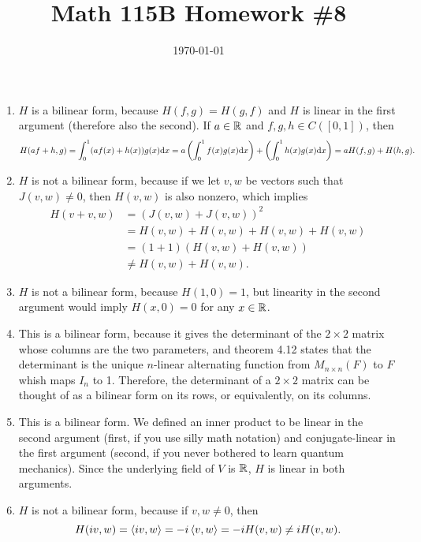 \documentclass{article}
\date{\today}
\title{Math 115B Homework \#8}
\begin{document}
\maketitle

\begin{prob}
\end{prob}
\begin{enumerate}[label=(\alph*)]
    \item $H$ is a bilinear form, because $H(f,g)=H(g,f)$ and $H$ is linear in the first argument (therefore also the second). If $a \in \mathbb{R}$ and $f,g,h \in C([0,1])$, then
        \[ H(af+h,g)=\int_0^1 (af(x)+h(x))g(x) \mathrm{d} x = a \left( \int_0^1 f(x) g(x) \mathrm{d} x \right) +\left( \int_0^1 h(x)g(x) \mathrm{d} x \right) = aH(f,g)+H(h,g). \]
    \item $H$ is not a bilinear form, because if we let $v,w$ be vectors such that $J(v,w) \neq 0$, then $H(v,w)$ is also nonzero, which implies \begin{align*}
            H(v+v,w) &= (J(v,w)+J(v,w))^2 \\
                     &= H(v,w)+H(v,w)+H(v,w)+H(v,w) \\
                     &= (1+1)(H(v,w)+H(v,w)) \\
                     &\neq H(v,w)+H(v,w).
    \end{align*}
\item $H$ is not a bilinear form, because $H(1, 0)=1$, but linearity in the second argument would imply $H(x, 0)=0$ for any $x \in \mathbb{R}$.
\item This is a bilinear form, because it gives the determinant of the $2 \times 2$ matrix whose columns are the two parameters, and theorem 4.12 states that the determinant is the unique $n$-linear alternating function from $M_{n \times n}(F)$ to $F$ whish maps $I_n$ to 1. Therefore, the determinant of a $2 \times 2$ matrix can be thought of as a bilinear form on its rows, or equivalently, on its columns.
\item This is a bilinear form. We defined an inner product to be linear in the second argument (first, if you use silly math notation) and conjugate-linear in the first argument (second, if you never bothered to learn quantum mechanics). Since the underlying field of $V$ is $\mathbb{R}$, $H$ is linear in both arguments.
\item $H$ is not a bilinear form, because if $v, w \neq 0$, then
    \[ H(iv, w) = \left\langle iv, w \right\rangle = -i \left\langle v, w \right\rangle = -i H(v, w) \neq i H(v,w). \]
\end{enumerate}
\end{document}
